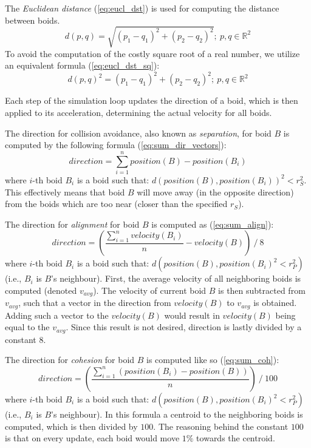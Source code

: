 \documentclass[9pt]{pnas-new}
\begin{document}
\noindent The {\em Euclidean distance} (\ref{eq:eucl_dst}) is used for computing the distance between boids.
\begin{equation} \label{eq:eucl_dst}
	d(p, q) = \sqrt{(p_1-q_1)^2 + (p_2 - q_2)^2};\  p, q \in \mathbb{R}^2
\end{equation}
To avoid the computation of the costly square root of a real number, we utilize an equivalent formula
(\ref{eq:eucl_dst_sq}):
\begin{equation} \label{eq:eucl_dst_sq}
	d(p, q)^2 = (p_1-q_1)^2 + (p_2 - q_2)^2;\  p, q \in \mathbb{R}^2
\end{equation}

Each step of the simulation loop updates the direction of a boid, which is then applied to its acceleration,
determining the actual velocity for all boids.

The direction for collision avoidance, also known as {\em separation}, for boid $B$ is computed by the
following formula (\ref{eq:sum_dir_vectors}):
\begin{equation} \label{eq:sum_dir_vectors}
	direction = \sum_{i=1}^{n} position(B) - position(B_i)
\end{equation}
where $i$-th boid $B_i$ is a boid such that: $ d(position(B), position(B_i))^2 < r_S^2 $.
This effectively means that boid $B$ will move away (in the opposite direction) from the boids which are too near (closer than the specified $r_S$).

The direction for {\em alignment} for boid $B$ is computed as (\ref{eq:sum_align}):
\begin{equation} \label{eq:sum_align}
	direction = \left( \frac{\sum_{i=1}^{n} velocity(B_i)}{n} - velocity(B) \right) \mathbin{/} 8
\end{equation}
where $i$-th boid $B_i$ is a boid such that: $ d(position(B), position(B_i)^2 < r_P^2) $ (i.e., $B_i$ is $B$'s neighbour).
First, the average velocity of all neighboring boids is computed (denoted $v_{avg}$).
The velocity of current boid $B$ is then subtracted from $v_{avg}$, such that a vector in the direction
from $velocity(B)$ to $v_{avg}$ is obtained.
Adding such a vector to the $velocity(B)$ would result in $velocity(B)$ being equal to the $v_{avg}$.
Since this result is not desired, direction is lastly divided by a constant $8$.

The direction for {\em cohesion} for boid $B$ is computed like so (\ref{eq:sum_coh}):
\begin{equation} \label{eq:sum_coh}
	direction = \left( \frac{\sum_{i=1}^{n} \left(position(B_i) - position(B)\right)}{n} \right) \mathbin{/} 100
\end{equation}
where $i$-th boid $B_i$ is a boid such that: $ d(position(B), position(B_i)^2 < r_P^2) $ (i.e., $B_i$ is $B$'s neighbour).
In this formula a centroid to the neighboring boids is computed, which is then divided by $100$.
The reasoning behind the constant $100$ is that on every update, each boid would move $1\%$ towards the centroid.
\end{document}
